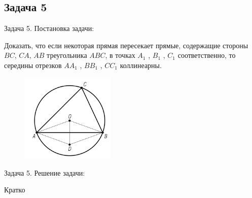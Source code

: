 \documentclass{beamer}
\begin{document}
\begin{frame}
   \subsection{Задача 5}
   \begin{block}{Задача 5. Постановка задачи:}


      Доказать, что если некоторая прямая пересекает прямые, содержащие стороны \(BC\), \(CA\), \(AB\) треугольника \(ABC\), в точках \(A_1\) , \(B_1\) , \(C_1\) соответственно, то середины отрезков \(AA_1\) , \(BB_1\) , \(CC_1\) коллинеарны.

      \begin{figure}[h]
         \centering
         \includegraphics[width=0.4\textwidth]{images/task1.png}
         \label{task5}
      \end{figure}
   \end{block}
\end{frame}

\begin{frame}
   \begin{block}{Задача 5. Решение задачи:}

      Кратко
   \end{block}
\end{frame}
\end{document}
